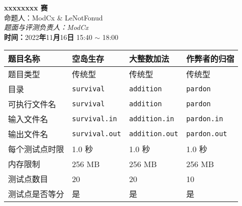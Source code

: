 \documentclass[UTF8,a4paper]{ctexart}
\begin{document}
    \pagestyle{fancy}
     \rhead{}
    \thispagestyle{empty}
    \begin{center}
        \Huge
        \textbf{xxxxxxxx 赛}
        \\
        \Large 
        命题人：ModCx \& LeNotFonud
        \\
        \Large
        \textit{题面与评测负责人：ModCx}
        \\
        \Large
        \textbf{时间：}2022\textbf{年}11\textbf{月}16\textbf{日} 15:40 $\sim$ 18:00
        \\
    \end{center}
    \large
    \begin{center}
        \begin{tabular}{|p{4cm}|p{3.2cm}|p{3.2cm}|p{3.2cm}|}
        \hline
        题目名称 & 空岛生存 & 大整数加法 & 作弊者的归宿 \\
        \hline
        题目类型 & 传统型 & 传统型 & 传统型 \\
        \hline
        目录 & \texttt{survival} & \texttt{addition} & \texttt{pardon} \\
        \hline
        可执行文件名 & \texttt{survival} & \texttt{addition} & \texttt{pardon} \\
        \hline
        输入文件名 & \texttt{survival.in} & \texttt{addition.in} & \texttt{pardon.in} \\
        \hline
        输出文件名 & \texttt{survival.out} & \texttt{addition.out} & \texttt{pardon.out} \\
        \hline
        每个测试点时限 & 1.0 秒 & 1.0 秒 & 1.0 秒 \\
        \hline
        内存限制 & 256 MB & 256 MB & 256 MB \\
        \hline
        测试点数目 & 20 & 20 & 10 \\
        \hline
        测试点是否等分 & 是 & 是 & 是 \\
        \hline
        \end{tabular}
    \end{center}
\end{document}

